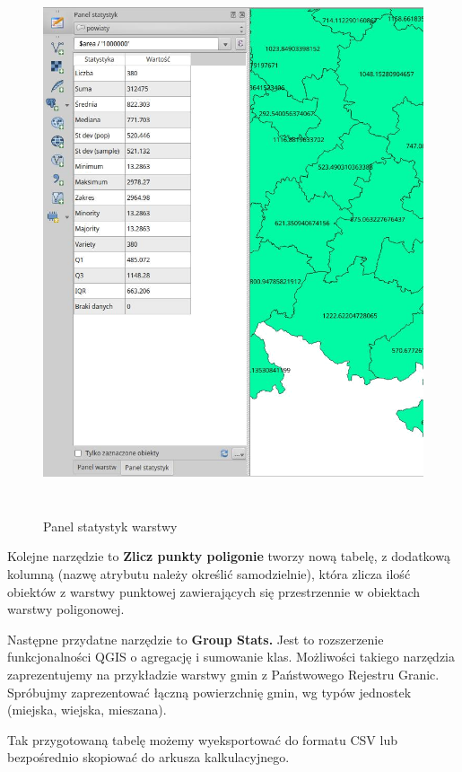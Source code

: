 \documentclass[12pt,a4paper]{book}
\begin{document}
\begin{center}
\begin{figure}
\includegraphics[width=13cm,height=16.013cm]{003-panel-stat.png}
\caption{Panel statystyk warstwy}
\end{figure}
\end{center}
Kolejne narzędzie to \textbf{Zlicz punkty poligonie} tworzy nową tabelę, z dodatkową kolumną (nazwę atrybutu należy określić samodzielnie), która zlicza ilość obiektów z warstwy punktowej zawierających się przestrzennie w obiektach warstwy poligonowej.

Następne przydatne narzędzie to \textbf{Group Stats. }Jest to rozszerzenie funkcjonalności QGIS o agregację i sumowanie klas. Możliwości takiego narzędzia zaprezentujemy na przykładzie warstwy gmin z Państwowego Rejestru Granic. Spróbujmy zaprezentować łączną powierzchnię gmin, wg typów jednostek (miejska, wiejska, mieszana).

Tak przygotowaną tabelę możemy wyeksportować do formatu CSV lub bezpośrednio skopiować do arkusza kalkulacyjnego.
\end{document}
